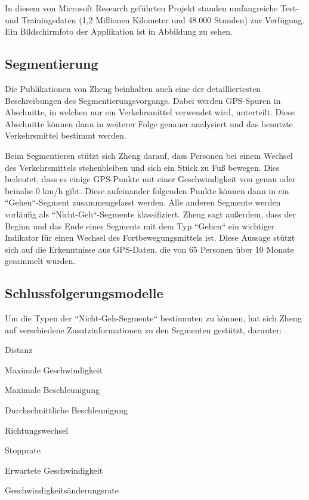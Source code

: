 In diesem von Microsoft Research geführten Projekt standen umfangreiche Test- und Trainingsdaten (1,2 Millionen Kilometer und 48.000 Stunden) zur Verfügung. \cite{microsoft_research_geolife_2015} Ein Bildschirmfoto der Applikation ist in Abbildung  zu sehen. 

\subsection{Segmentierung}
Die Publikationen von Zheng beinhalten auch eine der detailliertesten Beschreibungen des Segmentierungsvorgangs. Dabei werden GPS-Spuren in Abschnitte, in welchen nur ein Verkehrsmittel verwendet wird, unterteilt. Diese Abschnitte können dann in weiterer Folge genauer analysiert und das benutzte Verkehrsmittel bestimmt werden.

Beim Segmentieren stützt sich Zheng darauf, dass Personen bei einem Wechsel des Verkehrsmittels stehenbleiben und sich ein Stück zu Fuß bewegen. Dies bedeutet, dass es einige GPS-Punkte mit einer Geschwindigkeit von genau oder beinahe 0 km/h gibt. Diese aufeinander folgenden Punkte können dann in ein ``Gehen``-Segment zusammengefasst werden. Alle anderen Segmente werden vorläufig als ``Nicht-Geh``-Segmente klassifiziert. Zheng sagt außerdem, dass der Beginn und das Ende eines Segments mit dem Typ ``Gehen`` ein wichtiger Indikator für einen Wechsel des Fortbewegungsmittels ist. Diese Aussage stützt sich auf die Erkenntnisse aus GPS-Daten, die von 65 Personen über 10 Monate gesammelt wurden.

\subsection{Schlussfolgerungsmodelle} \label{schlussfolgerungsmodelle}
Um die Typen der ``Nicht-Geh-Segmente`` bestimmten zu können, hat sich Zheng auf verschiedene Zusatzinformationen zu den Segmenten gestützt, darunter:

\begin{pitemize}
\item Distanz
\item Maximale Geschwindigkeit
\item Maximale Beschleunigung
\item Durchschnittliche Beschleunigung
\item Richtungswechsel
\item Stopprate
\item Erwartete Geschwindigkeit
\item Geschwindigkeitsänderungsrate
\end{pitemize}

